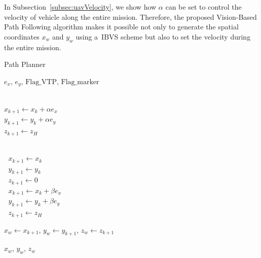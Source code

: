 In Subsection~\ref{subsec:uavVelocity}, we show how $\alpha$ can be set to control the velocity of vehicle along the entire mission. Therefore, the proposed Vision-Based Path Following algorithm makes it possible not only to generate the spatial coordinates $x_w$ and $y_w$ using a~\gls{IBVS} scheme but also to set the velocity during the entire mission.

\begin{algorithm}
	\caption{Path Planner}\label{alg:pathPlanner}
	\begin{algorithmic}[1]
		\State $e_x$, $e_y$, $\text{Flag\_VTP}$, $\text{Flag\_marker}$ 
		
		 \\
		\quad $x_{k+1} \gets x_k + \alpha e_x$\\
		\quad $y_{k+1} \gets y_k + \alpha e_y$\\
		\quad $z_{k+1} \gets  z_H$
		\EndIf
		
		 \\
		\quad \quad $\;$ $x_{k+1}  \gets x_k $\\
		\quad \quad $\;$ $y_{k+1} \gets y_k $\\
		\quad \quad $\;$ $z_{k+1} \gets 0$
		\Else \\
		\quad \quad $\;$ $x_{k+1} \gets x_k + \beta e_x$\\
		\quad \quad $\;$ $y_{k+1}  \gets y_k + \beta e_y$\\
		\quad \quad $\;$ $z_{k+1} \gets z_H$
		\EndIf \EndIf
		
		\State $x_w \gets x_{k+1}$, $y_w \gets y_{k+1}$, $z_w \gets z_{k+1}$
		
		\State \Return $x_w$, $y_w$, $z_w$
	\end{algorithmic}
\end{algorithm} 


